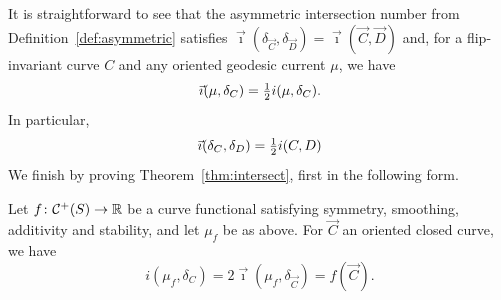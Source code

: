 It is straightforward to see that the asymmetric intersection number from Definition~\ref{def:asymmetric} satisfies $\vec{\imath} (\delta_{\vec C}, \delta_{\vec D}) = \vec\imath(\vec C, \vec D)$ and, for a flip-invariant curve $C$ and any oriented geodesic current $\mu$, we have
  \[
  \vec{\imath}(\mu, \delta_{C}) = {\textstyle \frac{1}{2}} i(\mu, \delta_C).
  \]
In particular,
\[
\vec{\imath}(\delta_C, \delta_D) = {\textstyle \frac{1}{2}} i(C,D)
\]
We finish by proving Theorem~\ref{thm:intersect}, first in the following
form.

\begin{theorem}
  \label{thm:recoverintersection}
Let $f \colon \mathcal{C}^+(S) \to \mathbb{R}$ be a curve functional
satisfying symmetry, smoothing, additivity and stability, and let
$\mu_f$ be as above.
For $\vec C$ an oriented closed curve, we have
\[
i(\mu_f, \delta_C) =
  2\vec\imath(\mu_f, \delta_{\vec C}) = f(\vec C).
\]
\end{theorem}
